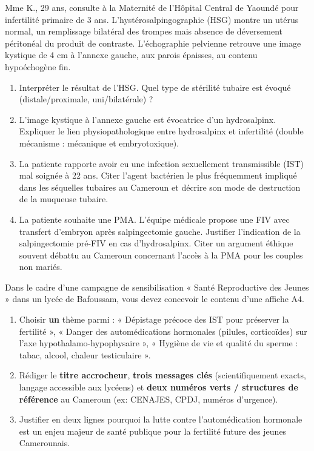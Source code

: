 \documentclass[11pt]{article}
\begin{document}
\begin{exercice}
Mme K., 29 ans, consulte à la Maternité de l'Hôpital Central de Yaoundé pour infertilité primaire de 3 ans. L'hystérosalpingographie (HSG) montre un utérus normal, un remplissage bilatéral des trompes mais absence de déversement péritonéal du produit de contraste. L'échographie pelvienne retrouve une image kystique de 4 cm à l'annexe gauche, aux parois épaisses, au contenu hypoéchogène fin.
\begin{enumerate}
    \item Interpréter le résultat de l'HSG. Quel type de stérilité tubaire est évoqué (distale/proximale, uni/bilatérale) ?
    \item L'image kystique à l'annexe gauche est évocatrice d'un hydrosalpinx. Expliquer le lien physiopathologique entre hydrosalpinx et infertilité (double mécanisme : mécanique et embryotoxique).
    \item La patiente rapporte avoir eu une infection sexuellement transmissible (IST) mal soignée à 22 ans. Citer l'agent bactérien le plus fréquemment impliqué dans les séquelles tubaires au Cameroun et décrire son mode de destruction de la muqueuse tubaire.
    \item La patiente souhaite une PMA. L'équipe médicale propose une FIV avec transfert d'embryon après salpingectomie gauche. Justifier l'indication de la salpingectomie pré-FIV en cas d'hydrosalpinx. Citer un argument éthique souvent débattu au Cameroun concernant l'accès à la PMA pour les couples non mariés.
\end{enumerate}
\end{exercice}

\begin{exercice}
Dans le cadre d'une campagne de sensibilisation « Santé Reproductive des Jeunes » dans un lycée de Bafoussam, vous devez concevoir le contenu d'une affiche A4.
\begin{enumerate}
    \item Choisir \textbf{un} thème parmi : « Dépistage précoce des IST pour préserver la fertilité », « Danger des automédications hormonales (pilules, corticoïdes) sur l'axe hypothalamo-hypophysaire », « Hygiène de vie et qualité du sperme : tabac, alcool, chaleur testiculaire ».
    \item Rédiger le \textbf{titre accrocheur}, \textbf{trois messages clés} (scientifiquement exacts, langage accessible aux lycéens) et \textbf{deux numéros verts / structures de référence} au Cameroun (ex: CENAJES, CPDJ, numéros d'urgence).
    \item Justifier en deux lignes pourquoi la lutte contre l'automédication hormonale est un enjeu majeur de santé publique pour la fertilité future des jeunes Camerounais.
\end{enumerate}
\end{exercice}
\end{document}
